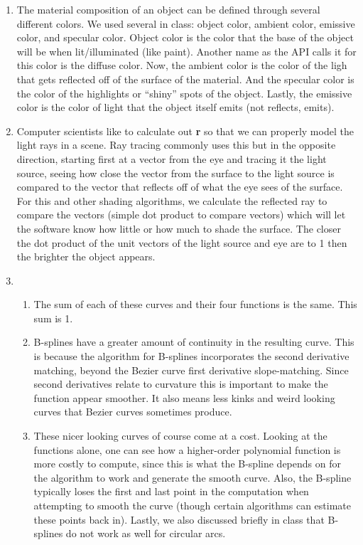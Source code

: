 \documentclass[11pt]{article}
\begin{document}
\begin{enumerate}
  \item The material composition of an object can be defined through several different colors. We used several in class: object color, ambient color, emissive color, and specular color. Object color is the color that the base of the object will be when lit/illuminated (like paint). Another name as the API calls it for this color is the diffuse color. Now, the ambient color is the color of the ligh that gets reflected off of the surface of the material. And the specular color is the color of the highlights or ``shiny'' spots of the object. Lastly, the emissive color is the color of light that the object itself emits (not reflects, emits).

  \item Computer scientists like to calculate out \textbf{r} so that we can properly model the light rays in a scene. Ray tracing commonly uses this but in the opposite direction, starting first at a vector from the eye and tracing it the light source, seeing how close the vector from the surface to the light source is compared to the vector that reflects off of what the eye sees of the surface. For this and other shading algorithms, we calculate the reflected ray to compare the vectors (simple dot product to compare vectors) which will let the software know how little or how much to shade the surface. The closer the dot product of the unit vectors of the light source and eye are to 1 then the brighter the object appears.

  \item
    \begin{enumerate}
      \item The sum of each of these curves and their four functions is the same. This sum is 1.
      \item B-splines have a greater amount of continuity in the resulting curve. This is because the algorithm for B-splines incorporates the second derivative matching, beyond the Bezier curve first derivative slope-matching. Since second derivatives relate to curvature this is important to make the function appear smoother. It also means less kinks and weird looking curves that Bezier curves sometimes produce.
      \item These nicer looking curves of course come at a cost. Looking at the functions alone, one can see how a higher-order polynomial function is more costly to compute, since this is what the B-spline depends on for the algorithm to work and generate the smooth curve. Also, the B-spline typically loses the first and last point in the computation when attempting to smooth the curve (though certain algorithms can estimate these points back in). Lastly, we also discussed briefly in class that B-splines do not work as well for circular arcs.
    \end{enumerate}


\end{enumerate}
\end{document}
